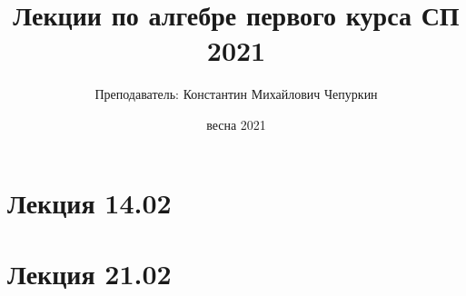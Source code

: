 \documentclass[a4paper]{article}
\title{Лекции по алгебре первого курса СП 2021}
\author{Преподаватель: Константин Михайлович Чепуркин}
\date{весна 2021}
\theoremstyle{definition}
\begin{document}
\maketitle

\section*{Лекция 14.02}


\section*{Лекция 21.02}

\end{document}
